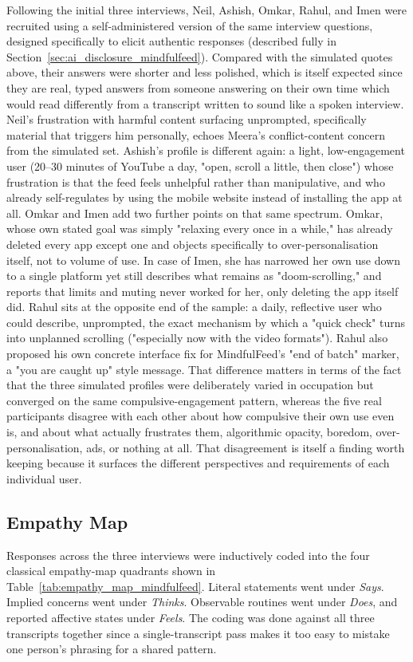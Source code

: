 \documentclass[11pt]{article}
\begin{document}
Following the initial three interviews, Neil, Ashish, Omkar, Rahul, and Imen were recruited using a self-administered version of the same interview questions, designed specifically to elicit authentic responses (described fully in Section~\ref{sec:ai_disclosure_mindfulfeed}). Compared with the simulated quotes above, their answers were shorter and less polished, which is itself expected since they are real, typed answers from someone answering on their own time which would read differently from a transcript written to sound like a spoken interview. Neil's frustration with harmful content surfacing unprompted, specifically material that triggers him personally, echoes Meera's conflict-content concern from the simulated set. Ashish's profile is different again: a light, low-engagement user (20--30 minutes of YouTube a day, "open, scroll a little, then close") whose frustration is that the feed feels unhelpful rather than manipulative, and who already self-regulates by using the mobile website instead of installing the app at all. Omkar and Imen add two further points on that same spectrum. Omkar, whose own stated goal was simply "relaxing every once in a while," has already deleted every app except one and objects specifically to over-personalisation itself, not to volume of use. In case of Imen, she has narrowed her own use down to a single platform yet still describes what remains as "doom-scrolling," and reports that limits and muting never worked for her, only deleting the app itself did. Rahul sits at the opposite end of the sample: a daily, reflective user who could describe, unprompted, the exact mechanism by which a "quick check" turns into unplanned scrolling ("especially now with the video formats"). Rahul also proposed his own concrete interface fix for MindfulFeed's "end of batch" marker, a "you are caught up" style message. That difference matters in terms of the fact that the three simulated profiles were deliberately varied in occupation but converged on the same compulsive-engagement pattern, whereas the five real participants disagree with each other about how compulsive their own use even is, and about what actually frustrates them, algorithmic opacity, boredom, over-personalisation, ads, or nothing at all. That disagreement is itself a finding worth keeping because it surfaces the different perspectives and requirements of each individual user.

\subsection{Empathy Map}
\label{sec:empathy_map_mindfulfeed}
Responses across the three interviews were inductively coded into the four classical empathy-map quadrants shown in Table~\ref{tab:empathy_map_mindfulfeed}. Literal statements went under \textit{Says}. Implied concerns went under \textit{Thinks}. Observable routines went under \textit{Does}, and reported affective states under \textit{Feels}. The coding was done against all three transcripts together since a single-transcript pass makes it too easy to mistake one person's phrasing for a shared pattern.
\end{document}
